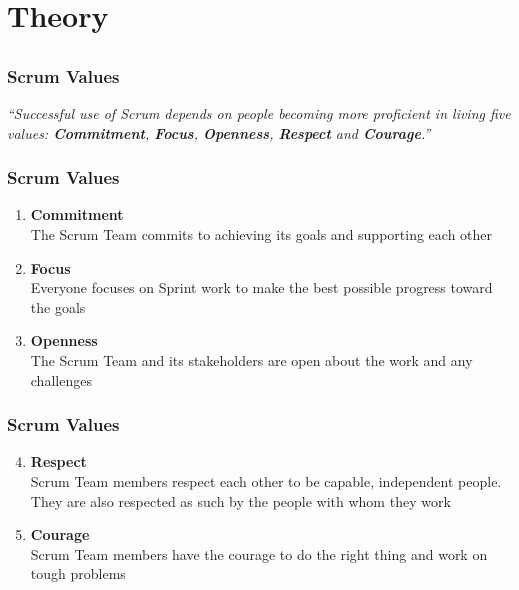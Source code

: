\section{Theory}
\subsection{}

\begin{frame}
    \frametitle{Scrum Values}
    \noindent
    \textit{``Successful use of Scrum depends on people becoming more proficient in living five values: \textbf{Commitment}, \textbf{Focus}, \textbf{Openness}, \textbf{Respect} and \textbf{Courage}.''}
\end{frame}

\begin{frame}
    \frametitle{Scrum Values}
    \begin{enumerate}
        \setlength\itemsep{0.7em}
        \item<1-> \textbf{Commitment}\\
	      The Scrum Team commits to achieving its goals and supporting each other
        \item<2-> \textbf{Focus}\\
            Everyone focuses on Sprint work to make the best possible progress toward the goals
        \item<3-> \textbf{Openness}\\
            The Scrum Team and its stakeholders are open about the work and any challenges
    \end{enumerate}
\end{frame}

\begin{frame}
    \frametitle{Scrum Values}
    \begin{enumerate}
        \setcounter{enumi}{3}
        \setlength\itemsep{0.7em}
        \item<1-> \textbf{Respect}\\
            Scrum Team members respect each other to be capable, independent people. They are also respected as such by the people with whom they work
        \item<2-> \textbf{Courage}\\
            Scrum Team members have the courage to do the right thing and work on tough problems
    \end{enumerate}
\end{frame}